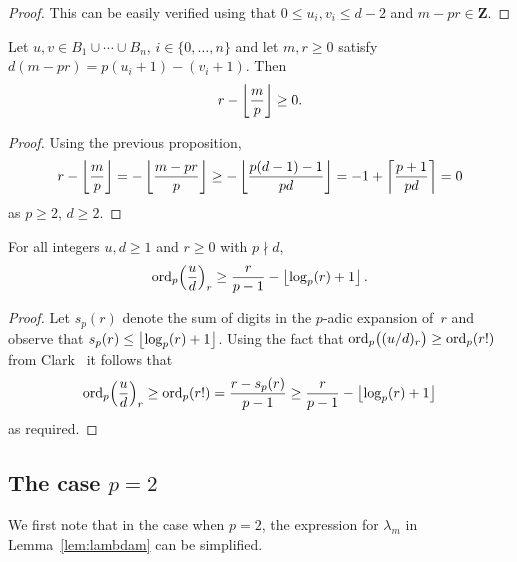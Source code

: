 \begin{proof}
This can be easily verified using that $0 \leq u_i, v_i \leq d - 2$ 
and $m - pr \in \mathbf{Z}$.
\end{proof}

\begin{prop} \label{prop:mpr2}
Let $u, v \in B_1 \cup \dotsb \cup B_n$, $i \in \{0,\dotsc,n\}$ and 
let $m, r \geq 0$ satisfy $d(m-pr) = p(u_i + 1) - (v_i + 1)$.  Then 
\begin{equation*}
r - \left\lfloor\frac{m}{p}\right\rfloor \geq 0.
\end{equation*}
\end{prop}

\begin{proof}
Using the previous proposition,
\begin{equation*}
r - \left\lfloor\frac{m}{p}\right\rfloor 
= - \left\lfloor\frac{m-pr}{p}\right\rfloor 
\geq - \left\lfloor\frac{p(d-1)-1}{pd}\right\rfloor 
= -1 + \left\lceil\frac{p + 1}{pd}\right\rceil 
= 0 
\end{equation*}
as $p \geq 2$, $d \geq 2$.
\end{proof}

\begin{prop} \label{prop:rfac}
For all integers $u, d \geq 1$ and $r \geq 0$ with $p \nmid d$, 
\begin{equation*}
\operatorname{ord}_p\Bigl(\frac{u}{d}\Bigr)_r \geq \frac{r}{p-1} - \left\lfloor\log_p(r) + 1\right\rfloor.
\end{equation*}
\end{prop}

\begin{proof}
Let $s_p(r)$ denote the sum of digits in the $p$-adic expansion of~$r$ 
and observe that $s_p(r) \leq \left\lfloor\log_p(r) + 1\right\rfloor$.  Using the fact that 
$\operatorname{ord}_p\bigl((u/d)_r\bigr) \geq \operatorname{ord}_p(r!)$ from 
Clark~\citep[Page~265, Case~3]{Clark66} it follows that 
\begin{equation*}
\operatorname{ord}_p\Bigl(\frac{u}{d}\Bigr)_r \geq \operatorname{ord}_p(r!) = \frac{r - s_p(r)}{p-1} \geq \frac{r}{p-1} - \left\lfloor\log_p(r) + 1\right\rfloor
\end{equation*}
as required.
\end{proof}


\subsection{The case $p = 2$}

We first note that in the case when $p = 2$, the expression for 
$\lambda_m$ in Lemma~\ref{lem:lambdam} can be simplified.


